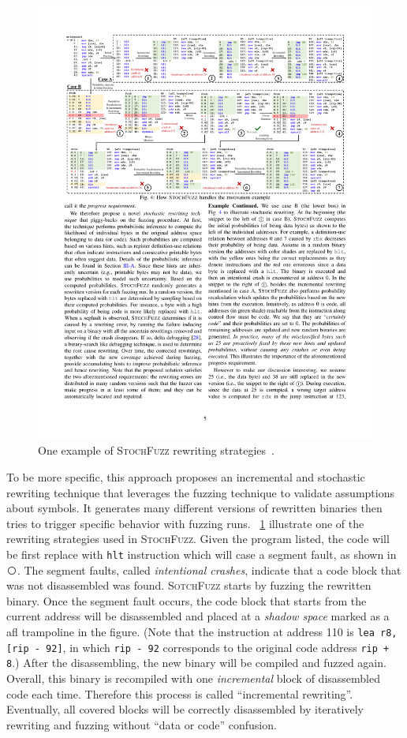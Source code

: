 \begin{figure}[tb]
  \centering
  \includegraphics[width=1.0\textwidth]{fig/STOCHFUZZ.pdf}
  \caption{One example of \textsc{StochFuzz} rewriting strategies~\cite{zhang2021stochfuzz}.}
  \label{fig:stochfuzz}
\end{figure}

To be more specific, this approach proposes an incremental and stochastic 
rewriting technique that leverages the fuzzing technique to validate 
assumptions about symbols. It generates many different versions of rewritten 
binaries then tries to trigger specific behavior with fuzzing runs.
%
\F~\ref{fig:stochfuzz} illustrate one of the rewriting strategies used in 
\textsc{StochFuzz}. Given the program listed, the code will be first replace 
with \texttt{hlt} instruction which will case a segment fault, as shown in 
\textcircled{}. The segment faults, called \textit
{intentional crashes}, indicate that a code block that was not disassembled was 
found. \textsc{SotchFuzz} starts by fuzzing the rewritten binary. Once the 
segment fault occurs, the code block that starts from the current address will 
be disassembled and placed at a \textit{shadow space} marked as a afl 
trampoline in the figure. (Note that the instruction at address 110 is \texttt
{lea r8, [rip - 92]}, in which \texttt{rip - 92} corresponds to the original 
code address \texttt{rip + 8}.) After the disassembling, the new binary will be 
compiled and fuzzed again. Overall, this binary is recompiled with one \textit
{incremental} block of disassembled code each time. Therefore this process is 
called ``incremental rewriting''. Eventually, all covered blocks will be 
correctly disassembled by iteratively rewriting and fuzzing without ``data or 
code'' confusion.
